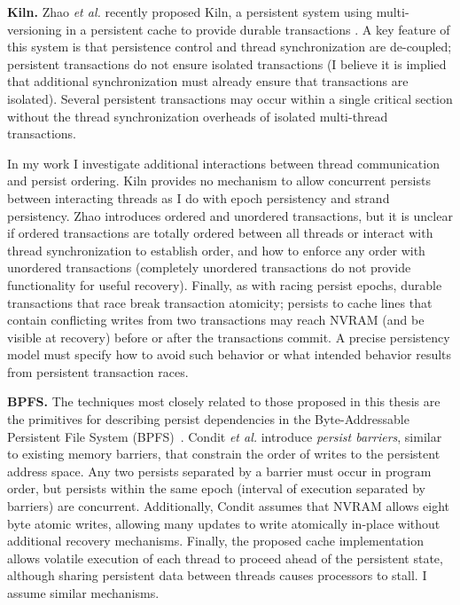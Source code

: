 \textbf{Kiln.}
Zhao \emph{et al.} recently proposed Kiln, a persistent system using multi-versioning in a persistent cache to provide durable transactions \cite{ZhaoLi13}.
A key feature of this system is that persistence control and thread synchronization are de-coupled; persistent transactions do not ensure isolated transactions (I believe it is implied that additional synchronization must already ensure that transactions are isolated).
Several persistent transactions may occur within a single critical section without the thread synchronization overheads of isolated multi-thread transactions.

In my work I investigate additional interactions between thread communication and persist ordering.
Kiln provides no mechanism to allow concurrent persists between interacting threads as I do with epoch persistency and strand persistency.
Zhao introduces ordered and unordered transactions, but it is unclear if ordered transactions are totally ordered between all threads or interact with thread synchronization to establish order, and how to enforce any order with unordered transactions (completely unordered transactions do not provide functionality for useful recovery).
Finally, as with racing persist epochs, durable transactions that race break transaction atomicity; persists to cache lines that contain conflicting writes from two transactions may reach NVRAM (and be visible at recovery) before or after the transactions commit.
A precise persistency model must specify how to avoid such behavior or what intended behavior results from persistent transaction races.

\textbf{BPFS.}
The techniques most closely related to those proposed in this thesis are the primitives for describing persist dependencies in the Byte-Addressable Persistent File System (BPFS)~\cite{ConditNightingale09}.
Condit \emph{et al.} introduce \emph{persist barriers}, similar to existing memory barriers, that constrain the order of writes to the persistent address space.
Any two persists separated by a barrier must occur in program order, but persists within the same epoch (interval of execution separated by barriers) are concurrent.
Additionally, Condit assumes that NVRAM allows eight byte atomic writes, allowing many updates to write atomically in-place without additional recovery mechanisms.
Finally, the proposed cache implementation allows volatile execution of each thread to proceed ahead of the persistent state, although sharing persistent data between threads causes processors to stall.
I assume similar mechanisms.


